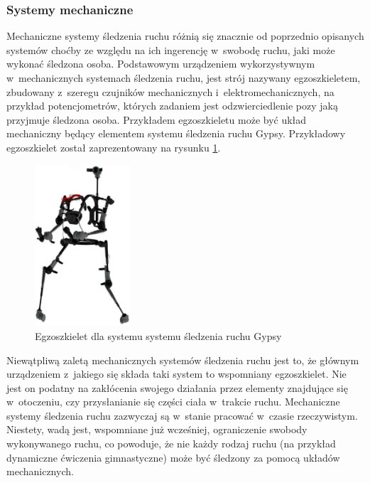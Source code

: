 \subsubsection*{Systemy mechaniczne}
Mechaniczne systemy śledzenia ruchu różnią się znacznie od poprzednio opisanych systemów choćby ze względu na ich ingerencję w~swobodę ruchu, jaki może wykonać śledzona osoba. Podstawowym urządzeniem wykorzystywnym w~mechanicznych systemach śledzenia ruchu, jest strój nazywany egzoszkieletem, zbudowany z~szeregu czujników mechanicznych i~elektromechanicznych, na przykład potencjometrów, których zadaniem jest odzwierciedlenie pozy jaką przyjmuje śledzona osoba. Przykładem egzoszkieletu może być układ mechaniczny będący elementem systemu śledzenia ruchu Gypsy{}. Przykładowy egzoszkielet został zaprezentowany na rysunku \ref{fig:literature:footnote:gypsy:full}.
									
\begin{savenotes}
	\begin{figure}[!htb]
		\centering	
		\includegraphics[height=6cm]{images/gypsy7_full.jpg}
		\caption[Egzoszkielet dla systemu systemu śledzenia ruchu Gypsy]{Egzoszkielet dla systemu systemu śledzenia ruchu Gypsy}	
		\label{fig:literature:footnote:gypsy:full}
	\end{figure}
\end{savenotes}
											
Niewątpliwą zaletą mechanicznych systemów śledzenia ruchu jest to, że głównym urządzeniem z~jakiego się składa taki system to wspomniany egzoszkielet. Nie jest on podatny na zakłócenia swojego działania przez elementy znajdujące się w~otoczeniu, czy przysłanianie się części ciała w~trakcie ruchu. Mechaniczne systemy śledzenia ruchu zazwyczaj są w~stanie pracować w~czasie rzeczywistym. Niestety, wadą jest, wspomniane już wcześniej, ograniczenie swobody wykonywanego ruchu, co powoduje, że nie każdy rodzaj ruchu (na przykład dynamiczne ćwiczenia gimnastyczne) może być śledzony za pomocą układów mechanicznych.
											
